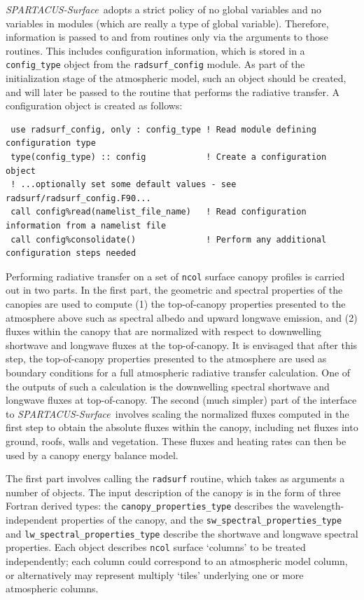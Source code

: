 \documentclass[a4,oneside]{article}
\def\codesize{\small}
\def\spsurf{\emph{SPARTACUS-Surface}}
\def\code#1{{\codesize\texttt{#1}}}
\begin{document}
\spsurf\ adopts a strict policy of no global variables and no
variables in modules (which are really a type of global
variable). Therefore, information is passed to and from routines only
via the arguments to those routines.  This includes configuration
information, which is stored in a \code{config\_type} object from the
\code{radsurf\_config} module. As part of the initialization stage of
the atmospheric model, such an object should be created, and will
later be passed to the routine that performs the radiative transfer. A
configuration object is created as follows:
%
\begin{lstlisting}
 use radsurf_config, only : config_type ! Read module defining configuration type
 type(config_type) :: config            ! Create a configuration object
 ! ...optionally set some default values - see radsurf/radsurf_config.F90...
 call config%read(namelist_file_name)   ! Read configuration information from a namelist file
 call config%consolidate()              ! Perform any additional configuration steps needed
\end{lstlisting}

Performing radiative transfer on a set of \code{ncol} surface canopy
profiles is carried out in two parts. In the first part, the geometric
and spectral properties of the canopies are used to compute (1) the
top-of-canopy properties presented to the atmosphere above such as
spectral albedo and upward longwave emission, and (2) fluxes within
the canopy that are normalized with respect to downwelling shortwave
and longwave fluxes at the top-of-canopy. It is envisaged that after
this step, the top-of-canopy properties presented to the atmosphere
are used as boundary conditions for a full atmospheric radiative
transfer calculation.  One of the outputs of such a calculation is the
downwelling spectral shortwave and longwave fluxes at
top-of-canopy. The second (much simpler) part of the interface to
\spsurf\ involves scaling the normalized fluxes computed in the first
step to obtain the absolute fluxes within the canopy, including net
fluxes into ground, roofs, walls and vegetation.  These fluxes and
heating rates can then be used by a canopy energy balance model.

The first part involves calling the \code{radsurf} routine, which
takes as arguments a number of objects.  The input description of the
canopy is in the form of three Fortran derived types: the
\code{canopy\_properties\_type} describes the wavelength-independent
properties of the canopy, and the
\code{sw\_spectral\_properties\_type} and
\code{lw\_spectral\_properties\_type} describe the shortwave and
longwave spectral properties.  Each object describes \code{ncol}
surface `columns' to be treated independently; each column could
correspond to an atmospheric model column, or alternatively may
represent multiply `tiles' underlying one or more atmospheric columns.
\end{document}
